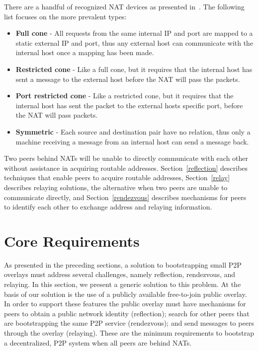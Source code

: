 \documentclass[conference]{IEEEtran}
\begin{document}
There are a handful of recognized NAT devices as presented in~\cite{stun,
p2p_nats_rfc}.  The following list focuses on the more prevalent types:
\begin{itemize}
\item \textbf{Full cone} - All requests from the same internal IP and port are
mapped to a static external IP and port, thus any external host can communicate
with the internal host once a mapping has been made.
\item \textbf{Restricted cone} - Like a full cone, but it requires that the
internal host has sent a message to the external host before the NAT will pass
the packets.
\item \textbf{Port restricted cone} - Like a restricted cone, but it requires
that the internal host has sent the packet to the external hosts specific port,
before the NAT will pass packets.
\item \textbf{Symmetric} - Each source and destination pair have no relation,
thus only a machine receiving a message from an internal host can send a
message back.
\end{itemize}

Two peers behind NATs will be unable to directly communicate with each other
without assistance in acquiring routable addresses.  Section~\ref{reflection}
describes techniques that enable peers to acquire routable addresses,
Section~\ref{relay} describes relaying solutions, the alternative when two
peers are unable to communicate directly, and Section~\ref{rendezvous}
describes mechanisms for peers to identify each other to exchange address and
relaying information.

\section{Core Requirements}
\label{overview}

As presented in the preceding sections, a solution to bootstrapping small P2P
overlays must address several challenges, namely reflection, rendezvous, and
relaying.  In this section, we present a generic solution to this problem.  At
the basis of our solution is the use of a publicly available free-to-join
public overlay.  In order to support these features the public overlay must
have mechanisms for peers to obtain a public network identity (reflection);
search for other peers that are bootstrapping the same P2P service
(rendezvous); and send messages to peers through the overlay (relaying).  These
are the minimum requirements to bootstrap a decentralized, P2P system when all
peers are behind NATs.
\end{document}
